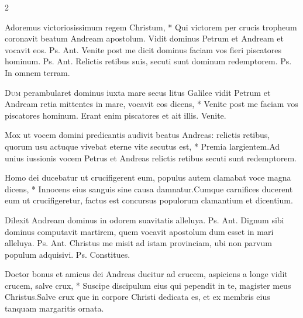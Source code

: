 \begin{multicols*}{2}
\begin{invitatory}
{Adoremus victoriosissimum regem Christum, * Qui victorem per crucis tropheum coronavit beatum Andream apostolum.}
 Vidit dominus Petrum et Andream et vocavit eos. {\color{Red} Ps.}  {\color{Red} Ant.} Venite post me dicit dominus faciam vos fieri piscatores hominum. {\color{Red} Ps.}  {\color{Red} Ant.} Relictis retibus suis, secuti sunt dominum redemptorem. {\color{Red} Ps.}  \V In omnem terram. \R
\end{invitatory}
\lettrine[lines=2]{\zallmancaps \color{Red} D}{um} \hypertarget{dum-perambularet}{\label{dum-perambularet}} perambularet dominus iuxta mare secus litus Galilee vidit Petrum et Andream retia mittentes in mare, vocavit eos dicens, * Venite post me faciam vos piscatores hominum. \V Erant enim piscatores et ait illis. Venite.
\begin{responsory}
{Mox ut vocem domini predicantis audivit beatus Andreas: relictis retibus, quorum usu actuque vivebat eterne vite secutus est, * Premia largientem.}{Ad unius iussionis vocem Petrus et Andreas relictis retibus secuti sunt redemptorem.}
\end{responsory}%
\begin{responsory-doxology}
{Homo dei ducebatur ut crucifigerent eum, populus autem clamabat voce magna dicens, * Innocens eius sanguis sine causa damnatur.}{Cumque carnifices ducerent eum ut crucifigeretur, factus est concursus populorum clamantium et dicentium.}
\end{responsory-doxology}%
 Dilexit Andream dominus in odorem suavitatis alleluya. {\color{Red} Ps.}  {\color{Red} Ant.} Dignum sibi dominus computavit martirem, quem vocavit apostolum dum esset in mari alleluya. {\color{Red} Ps.}  {\color{Red} Ant.} Christus me misit ad istam provinciam, ubi non parvum populum adquisivi. {\color{Red} Ps.}  \V Constitues.
\begin{responsory}
{Doctor bonus et amicus dei Andreas ducitur ad crucem, aspiciens a longe vidit crucem, salve crux, * Suscipe discipulum eius qui pependit in te, magister meus Christus.}{Salve crux que in corpore Christi dedicata es, et ex membris eius tanquam margaritis ornata.}

\end{responsory}
\end{multicols*}
